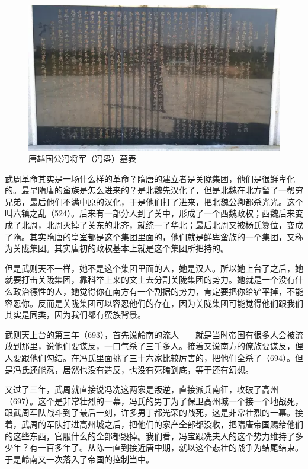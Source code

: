 \begin{figure}
	\centering
	\includegraphics[width=\textwidth]{images/image-24}
	\caption{唐越国公冯将军（冯盎）墓表}
\end{figure}

武周革命其实是一场什么样的革命？隋唐的建立者是关陇集团，他们是很鲜卑化的。最早隋唐的蛮族是怎么进来的？是北魏先汉化了，但是北魏在北方留了一帮穷兄弟，最后他们不满中原的汉化，于是他们打了进来，把北魏公卿都杀光光。这个叫六镇之乱（524）。后来有一部分人到了关中，形成了一个西魏政权；西魏后来变成了北周，北周灭掉了关东的北齐，就统一了华北；最后北周又被杨氏篡位，变成了隋。其实隋唐的皇室都是这个集团里面的，他们就是鲜卑蛮族的一个集团，又称为关陇集团。其实唐初的政权基本上就是这个集团所把持的。

但是武则天不一样，她不是这个集团里面的人，她是汉人。所以她上台了之后，她就要打击关陇集团，靠科举上来的文士去分割关陇集团的势力。她就是一个没有什么政治德性的人，她觉得你在南方有一个割据的势力，肯定要把你给铲平掉，不能容忍你。反而是关陇集团可以容忍他们的存在，因为关陇集团可能觉得他们跟我们其实是同类，因为我们都有蛮族背景。

武则天上台的第三年（693），首先说岭南的流人——就是当时帝国有很多人会被流放到那里，说他们要谋反，一口气杀了三千多人。接着又说南方的僚族要谋反，俚人要跟他们勾结。在冯氏里面挑了三十六家比较厉害的，把他们全杀了（694）。但是冯氏还能忍，居然也没有造反，也没有死磕到底，等于还有幻想。

又过了三年，武周就直接说冯冼这两家是叛逆，直接派兵南征，攻破了高州（697）。这个是非常壮烈的一幕，冯氏的男丁为了保卫高州城一个接一个地战死，跟武周军队战斗到了最后一刻，许多男丁都光荣的战死，这是非常壮烈的一幕。接着，武周的军队打进高州城之后，把他们的家产全部都没收，把隋唐帝国赐给他们的这些东西，官服什么的全部都毁掉。我们看，冯宝跟冼夫人的这个势力维持了多少年？有一百多年了。从陈一直到接近唐中期，就以这个悲壮的战争为结尾结束。于是岭南又一次落入了帝国的控制当中。

